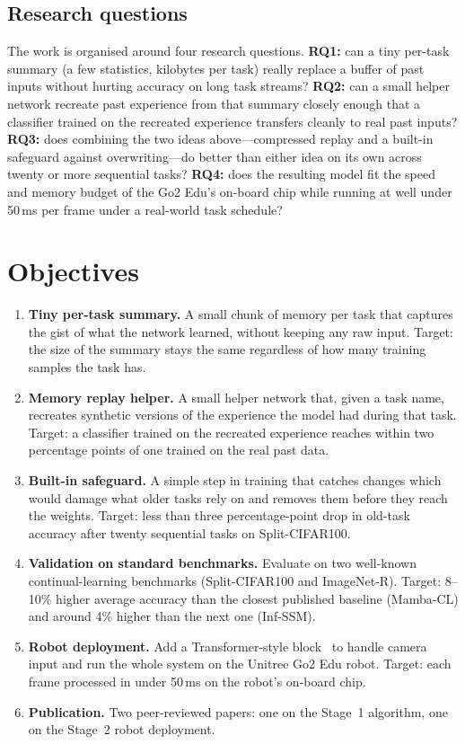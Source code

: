 \documentclass[11pt,a4paper]{article}
\newcommand{\objbold}[1]{\textbf{\color{neuroblue}#1}}
\begin{document}
\subsection{Research questions}
The work is organised around four research questions.
\textbf{RQ1:} can a tiny per-task summary (a few statistics, kilobytes per task) really replace a buffer of past inputs without hurting accuracy on long task streams?
\textbf{RQ2:} can a small helper network recreate past experience from that summary closely enough that a classifier trained on the recreated experience transfers cleanly to real past inputs?
\textbf{RQ3:} does combining the two ideas above---compressed replay and a built-in safeguard against overwriting---do better than either idea on its own across twenty or more sequential tasks?
\textbf{RQ4:} does the resulting model fit the speed and memory budget of the Go2 Edu's on-board chip while running at well under 50\,ms per frame under a real-world task schedule?

\section{Objectives}

\begin{enumerate}[label=\textbf{O\arabic*.},leftmargin=2.2em,itemsep=0.05em,topsep=0.1em]
  \item \objbold{Tiny per-task summary.} A small chunk of memory per task that captures the gist of what the network learned, without keeping any raw input. Target: the size of the summary stays the same regardless of how many training samples the task has.
  \item \objbold{Memory replay helper.} A small helper network that, given a task name, recreates synthetic versions of the experience the model had during that task. Target: a classifier trained on the recreated experience reaches within two percentage points of one trained on the real past data.
  \item \objbold{Built-in safeguard.} A simple step in training that catches changes which would damage what older tasks rely on and removes them before they reach the weights. Target: less than three percentage-point drop in old-task accuracy after twenty sequential tasks on Split-CIFAR100.
  \item \objbold{Validation on standard benchmarks.} Evaluate on two well-known continual-learning benchmarks (Split-CIFAR100 and ImageNet-R). Target: 8--10\% higher average accuracy than the closest published baseline (Mamba-CL) and around 4\% higher than the next one (Inf-SSM).
  \item \objbold{Robot deployment.} Add a Transformer-style block~\citep{vaswani2017attention} to handle camera input and run the whole system on the Unitree Go2 Edu robot. Target: each frame processed in under 50\,ms on the robot's on-board chip.
  \item \objbold{Publication.} Two peer-reviewed papers: one on the Stage~1 algorithm, one on the Stage~2 robot deployment.
\end{enumerate}
\end{document}
